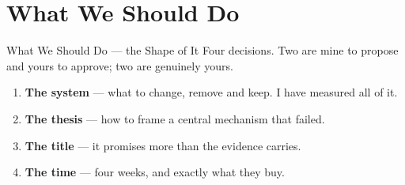 \documentclass[aspectratio=169,11pt]{beamer}
\begin{document}
\section{What We Should Do}

\begin{frame}{What We Should Do --- the Shape of It}
\small
Four decisions. Two are mine to propose and yours to approve; two are genuinely yours.
\vspace{2mm}

\small
\begin{enumerate}
  \setlength\itemsep{1.5mm}
  \item \textbf{The system} --- what to change, remove and keep. I have measured all of it.
  \item \textbf{The thesis} --- how to frame a central mechanism that failed.
  \item \textbf{The title} --- it promises more than the evidence carries.
  \item \textbf{The time} --- four weeks, and exactly what they buy.
\end{enumerate}
\end{frame}
\end{document}
